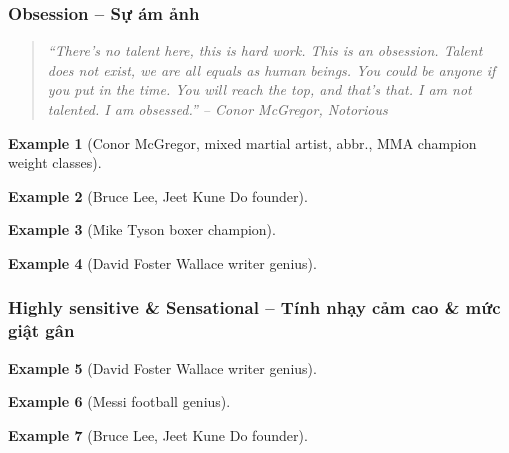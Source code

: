 \documentclass[12pt]{article}
\newtheorem{example}{Example}
\begin{document}
\subsubsection{Obsession -- Sự ám ảnh}

\begin{quotation}\it
	``There's no talent here, this is hard work. This is an obsession. Talent does not exist, we are all equals as human beings. You could be anyone if you put in the time. You will reach the top, and that's that. I am not talented. I am obsessed.'' -- {\sc Conor McGregor}, Notorious
\end{quotation}

\begin{example}[{\sc Conor McGregor}, mixed martial artist, abbr., MMA champion weight classes]
	
\end{example}

\begin{example}[{\sc Bruce Lee}, Jeet Kune Do founder]
	
\end{example}

\begin{example}[{\sc Mike Tyson} boxer champion]
	
\end{example}

\begin{example}[{\sc David Foster Wallace} writer genius]
	
\end{example}

\subsubsection{Highly sensitive \& Sensational -- Tính nhạy cảm cao \& mức giật gân}

\begin{example}[{\sc David Foster Wallace} writer genius]
	
\end{example}

\begin{example}[{\sc Messi} football genius]
	
\end{example}

\begin{example}[{\sc Bruce Lee}, Jeet Kune Do founder]
	
\end{example}
\end{document}
